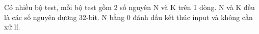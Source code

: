 Có nhiều bộ test, mỗi bộ test gồm 2 số nguyên N và K trên 1 dòng. N và K đều là các số nguyên dương 32-bit. N bằng 0 đánh dấu kết thúc input và không cần xử lí.  

\
